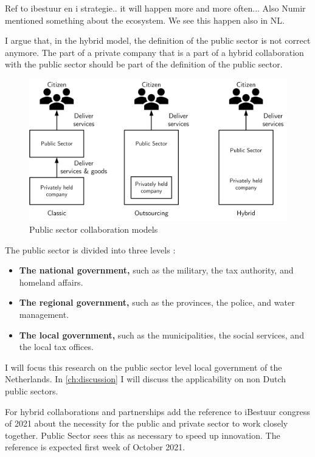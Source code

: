 \begin{remark}
Ref to ibestuur en i strategie.. it will happen more and more often... Also Numir mentioned something about the ecosystem. We see this happen also in NL.
\end{remark}

I argue that, in the hybrid model, the definition of the public sector is not correct anymore. The part of a private company that is a part of a hybrid collaboration with the public sector should be part of the definition of the public sector.

\begin{figure}[H]
	\centering
	\includegraphics[width=0.7\linewidth]{images/publicsector3modelsofcolaboration}
	\caption[Public sector collaboration models]{Public sector collaboration models}
	\label{fig:publicsector3modelsofcolaboration}
\end{figure}

The public sector is divided into three levels \parencite{PrivacySense2016}:

\begin{itemize}
	\item{\textbf{The national government,} such as the military, the tax authority, and homeland affairs.}
	\item{\textbf{The regional government,} such as the provinces, the police, and water management.}
	\item{\textbf{The local government,} such as the municipalities, the social services, and the local tax offices.}
\end{itemize}

I will focus this research on the public sector level local government of the Netherlands. In \cref{ch:discussion} I will discuss the applicability on non Dutch public sectors.


\begin{remark}
	For hybrid collaborations and partnerships add the reference to iBestuur congress of 2021 about the necessity for the public and private sector to work closely together. Public Sector sees this as necessary to speed up innovation. The reference is expected first week of October 2021.
\end{remark}

